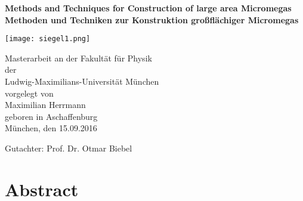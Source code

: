\documentclass[
a4paper,                                %
twoside,                                %
BCOR1.4cm,                      %
10pt,                           %
headings=normal,                %
headsepline,                    %
clearplainpage, %
final,                                  %
div=14,
parskip=full,
openright,
bibliography=toc
]{scrreprt}
\begin{document}

\thispagestyle{empty}
\begin{center}
    \vspace*{0.5cm}
    \sffamily\bfseries\huge Methods and Techniques for Construction of large area Micromegas\\   
    \vspace*{0.5cm}
    \sffamily\bfseries\huge Methoden und Techniken zur Konstruktion gro{\ss}fl\"achiger Micromegas\\     
\end{center}
\vspace*{3mm}
\begin{center}
        \texttt{[image: siegel1.png]}%
\end{center}
\vspace*{8mm}

\begin{center}
	\large Masterarbeit an der Fakult\"at f\"ur Physik\\
	\large der\\
	\large Ludwig-Maximilians-Universit\"at M\"unchen\\
	\vspace*{8mm}
	vorgelegt von \\
	\vspace*{1mm}
	{\Large Maximilian Herrmann}\\
	geboren in Aschaffenburg\\
	\vspace*{8mm}
	M\"unchen, den 15.09.2016
\end{center}
\thispagestyle{empty}

\newpage

\thispagestyle{empty}
\cleardoublepage

\begin{flushleft}
   	\large Gutachter:  Prof. Dr. Otmar Biebel \\[1mm]
\end{flushleft}

\thispagestyle{empty}

\chapter*{Abstract}
\end{document}
